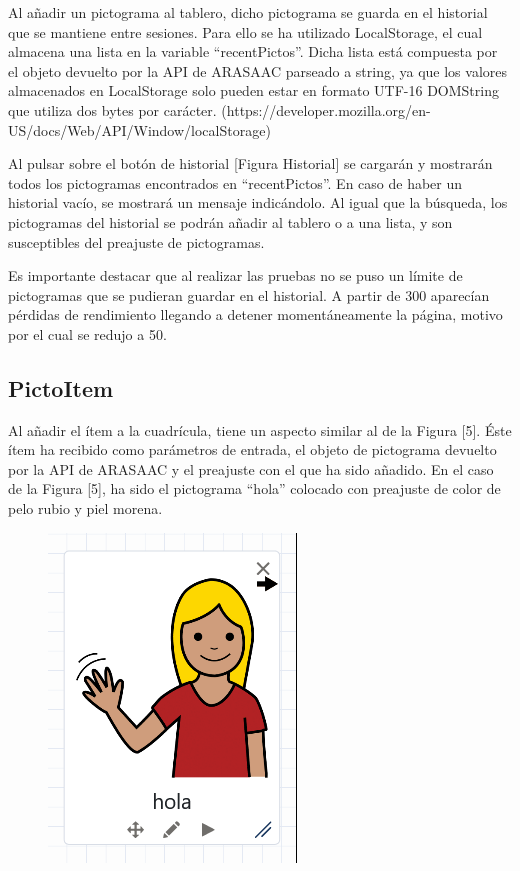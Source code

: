 Al añadir un pictograma al tablero, dicho pictograma se guarda en el historial que se mantiene entre sesiones. Para ello se ha utilizado LocalStorage, el cual almacena una lista en la variable “recentPictos”. Dicha lista está compuesta por el objeto devuelto por la API de ARASAAC parseado a string, ya que los valores almacenados en LocalStorage solo pueden estar en formato UTF-16 DOMString que utiliza dos bytes por carácter. (https://developer.mozilla.org/en-US/docs/Web/API/Window/localStorage) 

Al pulsar sobre el botón de historial  [Figura Historial] se cargarán y mostrarán todos los pictogramas encontrados en “recentPictos”. En caso de haber un historial vacío, se mostrará un mensaje indicándolo. Al igual que la búsqueda, los pictogramas del historial se podrán añadir al tablero o a una lista, y son susceptibles del preajuste de pictogramas.

Es importante destacar que al realizar las pruebas no se puso un límite de pictogramas que se pudieran guardar en el historial. A partir de 300 aparecían pérdidas de rendimiento llegando a detener momentáneamente la página, motivo por el cual se redujo a 50. 


\subsection{PictoItem}

Al añadir el ítem a la cuadrícula, tiene un aspecto similar al de la Figura [5]. Éste ítem ha recibido como parámetros de entrada, el objeto de pictograma devuelto por la API de ARASAAC y el preajuste con el que ha sido añadido. En el caso de la Figura [5], ha sido el pictograma “hola” colocado con preajuste de color de pelo rubio y piel morena. 

\begin{figure}[h!]
	\centering
	\includegraphics[width=0.7\linewidth]{Imagenes/Bitmap/pictoItemModificado}
	\caption{}
	\label{fig:pictoitemmodificado}
\end{figure}



